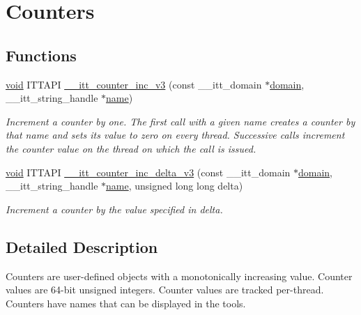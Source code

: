 \hypertarget{group__counters}{\section{Counters}
\label{group__counters}
}
\subsection*{Functions}
\begin{DoxyCompactItemize}
\item 
\hyperlink{ittnotify__static_8h_af941d56e55e3c5465135b60c4d6343ed}{void} I\-T\-T\-A\-P\-I \hyperlink{group__counters_gaa4f0172a7816793aa8adb3bb02a9500d}{\-\_\-\-\_\-itt\-\_\-counter\-\_\-inc\-\_\-v3} (const \-\_\-\-\_\-itt\-\_\-domain $\ast$\hyperlink{ittnotify__static_8h_ae4bc3459cfd348603d57d87ede15591b}{domain}, \-\_\-\-\_\-itt\-\_\-string\-\_\-handle $\ast$\hyperlink{ittnotify__static_8h_a1c34b35a4952969fef60192313bba34a}{name})
\begin{DoxyCompactList}\small\item\em Increment a counter by one. The first call with a given name creates a counter by that name and sets its value to zero on every thread. Successive calls increment the counter value on the thread on which the call is issued. \end{DoxyCompactList}\item 
\hyperlink{ittnotify__static_8h_af941d56e55e3c5465135b60c4d6343ed}{void} I\-T\-T\-A\-P\-I \hyperlink{group__counters_gaff266e66512b9314d16b16c1e67ef1f1}{\-\_\-\-\_\-itt\-\_\-counter\-\_\-inc\-\_\-delta\-\_\-v3} (const \-\_\-\-\_\-itt\-\_\-domain $\ast$\hyperlink{ittnotify__static_8h_ae4bc3459cfd348603d57d87ede15591b}{domain}, \-\_\-\-\_\-itt\-\_\-string\-\_\-handle $\ast$\hyperlink{ittnotify__static_8h_a1c34b35a4952969fef60192313bba34a}{name}, unsigned long long delta)
\begin{DoxyCompactList}\small\item\em Increment a counter by the value specified in delta. \end{DoxyCompactList}\end{DoxyCompactItemize}


\subsection{Detailed Description}
Counters are user-\/defined objects with a monotonically increasing value. Counter values are 64-\/bit unsigned integers. Counter values are tracked per-\/thread. Counters have names that can be displayed in the tools. 

